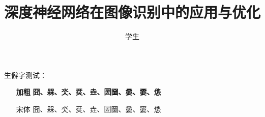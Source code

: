 \documentclass[oneside,degree=master,print=review]{GZUthesis} %
\author{学生}
\title{深度神经网络在图像识别中的应用与优化}
\begin{document}
    \maketitle
    \frontmatter
    
    \newpage
    \tableofcontents


    生僻字测试： 

    \begin{itemize}
        \item[\textbf{加粗}] {\textbf{囧、槑、氼、烎、垚、圐圙、嘦、嫑、怹  }}
        \item[宋体] 囧、槑、氼、烎、垚、圐圙、嘦、嫑、怹
    \end{itemize}

    \mainmatter


    
    
    

    \printbibliography[heading=bibliography,title=参考文献]
\end{document}
